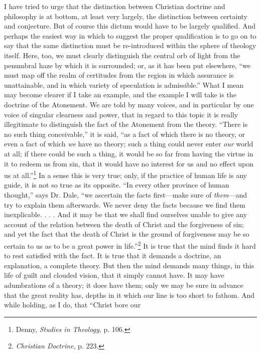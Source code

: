 \documentclass[12pt,a5paper]{article}
\begin{document}
I have tried to urge that the distinction between Christian
doctrine and philosophy is at bottom, at least very largely,
the distinction between certainty and conjecture. But of
course this dictum would have to be largely qualified. And
perhaps the easiest way in which to suggest the proper
qualification is to go on to say that the same distinction
must be re-introduced within the sphere of theology itself.
Here, too, we must clearly distinguish the central orb of
light from the penumbral haze by which it is surrounded; or,
as it has been put elsewhere, ``we must map off the realm
of certitudes from the region in which assurance is unattainable,
and in which variety of speculation is admissible.''
What I mean may become clearer if I take an example, and
the example I will take is the doctrine of the Atonement.
We are told by many voices, and in particular by one voice
of singular clearness and power, that in regard to this topic
it is really illegitimate to distinguish the fact of the Atonement
from the theory. ``There is no such thing conceivable,'' 
it is said, ``as a fact of which there is no theory, or
even a fact of which \textit{we} have no theory; such a thing
could never enter \textit{our} world at all; if there could be such a
thing, it would be so far from having the virtue in it to
redeem us from sin, that it would have no interest for us
and no effect upon us at all.''\footnote{
Denny, \textit{Studies in Theology}, p. 106.
}
In a sense this is very true;
only, if the practice of human life is any guide, it is not so
true as its opposite. ``In every other province of human
thought,'' says Dr. Dale, ``we ascertain the facts first---make
sure of \textit{them}---and try to explain them afterwards.
We never deny the facts because we find them inexplicable.
. . . And it may be that we shall find ourselves unable to
give any account of the relation between the death of
Christ and the forgiveness of sin; and yet the fact that the
death of Christ is the ground of forgiveness may be so
certain to us as to be a great power in life.''\footnote{
\textit{Christian Doctrine}, p. 223.
}
It is true
that the mind finds it hard to rest satisfied with the fact.
It is true that it demands a doctrine, an explanation, a
complete theory. But then the mind demands many things,
in this life of guilt and clouded vision, that it simply cannot
have. It may have adumbrations of a theory; it does have
them; only we may be sure in advance that the great
reality has, depths in it which our line is too short to
fathom. And while holding, as I do, that ``Christ bore our
\end{document}
